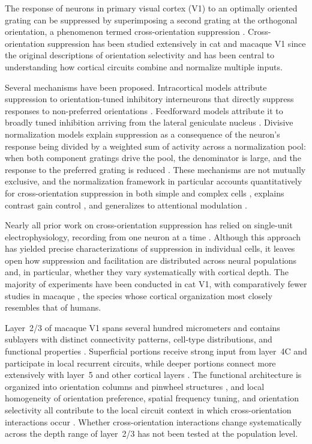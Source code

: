 \documentclass[11pt,letterpaper]{article}
\begin{document}
The response of neurons in primary visual cortex (V1) to an optimally
oriented grating can be suppressed by superimposing a second grating at the
orthogonal orientation, a phenomenon termed cross-orientation suppression
\citep{morrone1982, bonds1989, carandini1997, freeman2002}. Cross-orientation
suppression has been studied extensively in cat and macaque V1 since the
original descriptions of orientation selectivity \citep{hubel1962, hubel1968}
and has been central to understanding how cortical circuits combine and
normalize multiple inputs.

Several mechanisms have been proposed. Intracortical models attribute
suppression to orientation-tuned inhibitory interneurons that directly suppress
responses to non-preferred orientations \citep{sillito1975, bonds1989,
shapley2003}. Feedforward models attribute it to broadly tuned inhibition
arriving from the lateral geniculate nucleus \citep{priebe2006, li2006}.
Divisive normalization models explain suppression as a consequence of the
neuron's response being divided by a weighted sum of activity across a
normalization pool: when both component gratings drive the pool, the
denominator is large, and the response to the preferred grating is reduced
\citep{heeger1992, carandini2012}. These mechanisms are not mutually
exclusive, and the normalization framework in particular accounts
quantitatively for cross-orientation suppression in both simple and complex
cells \citep{carandini1997}, explains contrast gain control
\citep{albrecht1982, sclar1990, schwartz2001}, and generalizes to attentional
modulation \citep{reynolds2009}.

Nearly all prior work on cross-orientation suppression has relied on
single-unit electrophysiology, recording from one neuron at a time
\citep{deangelis1992, carandini1997, smith2006, busse2009}. Although this
approach has yielded precise characterizations of suppression in individual
cells, it leaves open how suppression and facilitation are distributed across
neural populations and, in particular, whether they vary systematically with
cortical depth. The majority of experiments have been conducted in cat V1,
with comparatively fewer studies in macaque \citep{carandini1997, smith2006},
the species whose cortical organization most closely resembles that of humans.

Layer~2/3 of macaque V1 spans several hundred micrometers and contains
sublayers with distinct connectivity patterns, cell-type distributions, and
functional properties \citep{lund1988, callaway1998, douglas2004, briggs2010}.
Superficial portions receive strong input from layer~4C and participate in
local recurrent circuits, while deeper portions connect more extensively with
layer~5 and other cortical layers \citep{callaway1998, douglas2004}. The
functional architecture is organized into orientation columns and pinwheel
structures \citep{blasdel1986, bonhoeffer1991, ohki2005, ohki2006}, and
local homogeneity of orientation preference, spatial frequency tuning, and
orientation selectivity all contribute to the local circuit context in which
cross-orientation interactions occur \citep{nauhaus2008, ringach2002}. Whether
cross-orientation interactions change systematically across the depth range of
layer~2/3 has not been tested at the population level.
\end{document}
